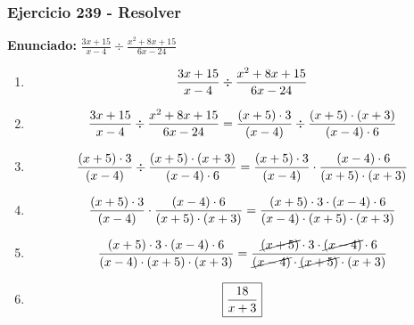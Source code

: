 \documentclass[11pt,a4paper]{article}
\newcommand{\fitmath}[1]{%
\[
\setbox0=\hbox{$\displaystyle #1$}%
\ifdim\wd0>\linewidth
\resizebox{\linewidth}{!}{$\displaystyle #1$}%
\else
#1%
\fi
\]
}
\begin{document}
\subsubsection*{Ejercicio 239 - Resolver}
\textbf{Enunciado:} $ \frac{3 x + 15}{x - 4} \div \frac{x^{2} + 8 x + 15}{6 x - 24} $\par
\begin{enumerate}[leftmargin=2em]
\item \fitmath{\frac{3 x + 15}{x - 4} \div \frac{x^{2} + 8 x + 15}{6 x - 24}}
\item \fitmath{\frac{3 x + 15}{x - 4} \div \frac{x^{2} + 8 x + 15}{6 x - 24}= \frac{\left(x + 5\right)\cdot 3}{\left(x - 4\right)} \div \frac{\left(x + 5\right)\cdot \left(x + 3\right)}{\left(x - 4\right)\cdot 6}}
\item \fitmath{\frac{\left(x + 5\right)\cdot 3}{\left(x - 4\right)}\div \frac{\left(x + 5\right)\cdot \left(x + 3\right)}{\left(x - 4\right)\cdot 6}= \frac{\left(x + 5\right)\cdot 3}{\left(x - 4\right)}\cdot \frac{\left(x - 4\right)\cdot 6}{\left(x + 5\right)\cdot \left(x + 3\right)}}
\item \fitmath{\frac{\left(x + 5\right)\cdot 3}{\left(x - 4\right)}\cdot \frac{\left(x - 4\right)\cdot 6}{\left(x + 5\right)\cdot \left(x + 3\right)}= \frac{\left(x + 5\right)\cdot 3\cdot \left(x - 4\right)\cdot 6}{\left(x - 4\right)\cdot \left(x + 5\right)\cdot \left(x + 3\right)}}
\item \fitmath{\frac{\left(x + 5\right)\cdot 3\cdot \left(x - 4\right)\cdot 6}{\left(x - 4\right)\cdot \left(x + 5\right)\cdot \left(x + 3\right)}= \frac{\cancel{\left(x + 5\right)}\cdot 3\cdot \cancel{\left(x - 4\right)}\cdot 6}{\cancel{\left(x - 4\right)}\cdot \cancel{\left(x + 5\right)}\cdot \left(x + 3\right)}}
\item \fitmath{\boxed{\frac{18}{x + 3}}}
\end{enumerate}

\vspace{0.12cm}
\end{document}
